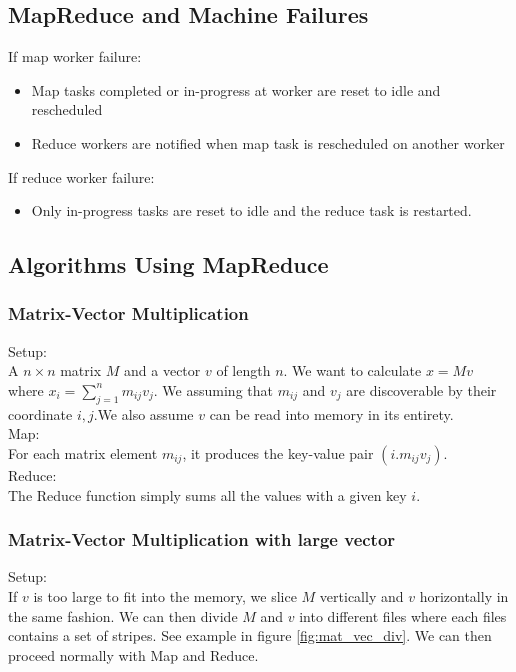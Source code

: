 \subsection{MapReduce and Machine Failures} 
If map worker failure: 
    \begin{itemize}
        \item Map tasks completed or in-progress at worker are reset to idle and rescheduled 
        \item Reduce workers are notified when map task is rescheduled on another worker
    \end{itemize}
If reduce worker failure: 
    \begin{itemize}
        \item Only in-progress tasks are reset to idle and the reduce task is restarted. 
    \end{itemize}



\subsection{Algorithms Using MapReduce} 
\subsubsection{Matrix-Vector Multiplication} 
Setup: \\
A $n \times n$ matrix $M$ and a vector $v$ of length $n$. We want to calculate $x = Mv$ where $x_i = \sum_{j=1}^n m_{ij}v_j$. We assuming that $m_{ij}$ and $v_j$ are discoverable by their coordinate $i,j$.We also assume $v$ can be read into memory in its entirety. \\

Map: \\
For each matrix element $m_{ij}$, it produces the key-value pair $(i. m_{ij}v_j)$. \\

Reduce: \\
The Reduce function simply sums all the values with a given key $i$. 

\subsubsection{Matrix-Vector Multiplication with large vector} 
Setup: \\
If $v$ is too large to fit into the memory, we slice $M$ vertically and $v$ horizontally in the same fashion. We can then divide $M$ and $v$ into different files where each files contains a set of stripes. See example in figure \ref{fig:mat_vec_div}. We can then proceed normally with Map and Reduce. 

